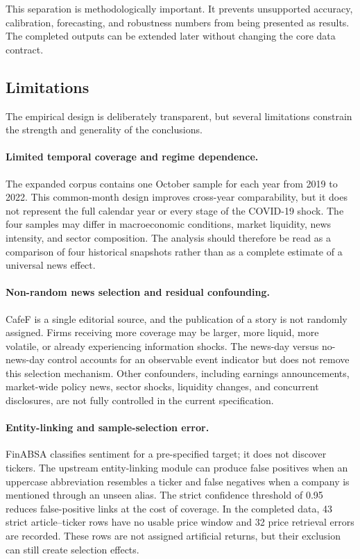 \documentclass[12pt,a4paper]{article}
\begin{document}
This separation is methodologically important. It prevents unsupported accuracy, calibration, forecasting, and robustness numbers from being presented as results. The completed outputs can be extended later without changing the core data contract.

\subsection{Limitations}
\label{subsec:limitations-statistical}

The empirical design is deliberately transparent, but several limitations constrain the strength and generality of the conclusions.

\paragraph{Limited temporal coverage and regime dependence.}
The expanded corpus contains one October sample for each year from 2019 to 2022. This common-month design improves cross-year comparability, but it does not represent the full calendar year or every stage of the COVID-19 shock. The four samples may differ in macroeconomic conditions, market liquidity, news intensity, and sector composition. The analysis should therefore be read as a comparison of four historical snapshots rather than as a complete estimate of a universal news effect.

\paragraph{Non-random news selection and residual confounding.}
CafeF is a single editorial source, and the publication of a story is not randomly assigned. Firms receiving more coverage may be larger, more liquid, more volatile, or already experiencing information shocks. The news-day versus no-news-day control accounts for an observable event indicator but does not remove this selection mechanism. Other confounders, including earnings announcements, market-wide policy news, sector shocks, liquidity changes, and concurrent disclosures, are not fully controlled in the current specification.

\paragraph{Entity-linking and sample-selection error.}
FinABSA classifies sentiment for a pre-specified target; it does not discover tickers. The upstream entity-linking module can produce false positives when an uppercase abbreviation resembles a ticker and false negatives when a company is mentioned through an unseen alias. The strict confidence threshold of 0.95 reduces false-positive links at the cost of coverage. In the completed data, 43 strict article--ticker rows have no usable price window and 32 price retrieval errors are recorded. These rows are not assigned artificial returns, but their exclusion can still create selection effects.
\end{document}
